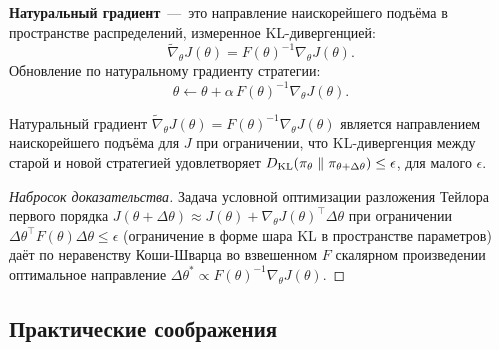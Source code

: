 \textbf{Натуральный градиент} \,---\, это направление наискорейшего подъёма в пространстве распределений, измеренное KL-дивергенцией:
\begin{equation}
\label{eq:natural-gradient}
\tilde\nabla_\theta J(\theta) = F(\theta)^{-1} \nabla_\theta J(\theta).
\end{equation}
Обновление по натуральному градиенту стратегии:
\begin{equation}
\label{eq:npg-update}
\theta \leftarrow \theta + \alpha\, F(\theta)^{-1} \nabla_\theta J(\theta).
\end{equation}

\begin{theorem}
\label{thm:npg}
Натуральный градиент $\tilde\nabla_\theta J(\theta) = F(\theta)^{-1} \nabla_\theta J(\theta)$ является направлением наискорейшего подъёма для $J$ при ограничении, что KL-дивергенция между старой и новой стратегией удовлетворяет $D_{\mathrm{KL}}\!\left(\pi_\theta\;\|\;\pi_{\theta + \Delta\theta}\right) \leq \epsilon$, для малого $\epsilon$.
\end{theorem}

\begin{proof}[Набросок доказательства]
Задача условной оптимизации разложения Тейлора первого порядка $J(\theta + \Delta\theta) \approx J(\theta) + \nabla_\theta J(\theta)^\top \Delta\theta$ при ограничении $\Delta\theta^\top F(\theta) \Delta\theta \leq \epsilon$ (ограничение в форме шара KL в пространстве параметров) даёт по неравенству Коши-Шварца во взвешенном $F$ скалярном произведении оптимальное направление $\Delta\theta^* \propto F(\theta)^{-1} \nabla_\theta J(\theta)$.
\end{proof}

\subsection{Практические соображения}


